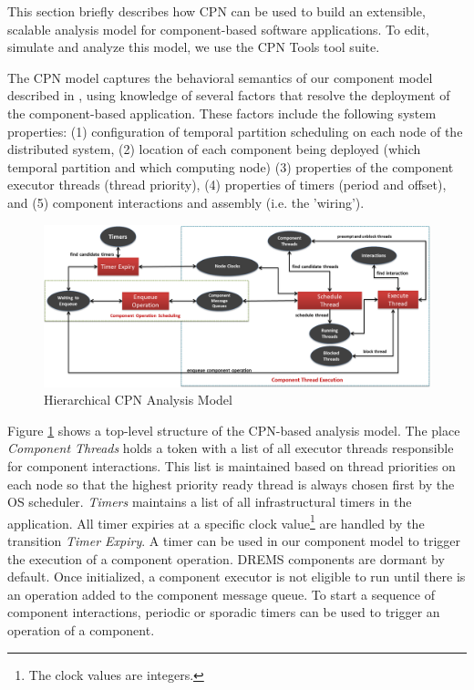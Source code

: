 This section briefly describes how CPN can be used to build an extensible, scalable analysis model for component-based software applications. To edit, simulate and analyze this model, we use the CPN Tools \cite{CPNTools} tool suite. 

The CPN model captures the behavioral semantics of our component model described in \cite{ISIS_F6_ISORC:13}, using knowledge of several factors that resolve the deployment of the component-based application. These factors include the following system properties: (1) configuration of temporal partition scheduling on each node of the distributed system, (2) location of each component being deployed (which temporal partition and which computing node) (3) properties of the component executor threads (thread priority), (4) properties of timers (period and offset), and (5) component interactions and assembly (i.e. the 'wiring'). 

\begin{figure}[t]
	\centering
	\includegraphics[width=\textwidth]{./figs/cpn_model}
	\caption{Hierarchical CPN Analysis Model}
	\label{fig:cpn_model}
	\vspace{-0.1in}
\end{figure}

Figure \ref{fig:cpn_model} shows a top-level structure of the CPN-based analysis model. The place \emph{Component Threads} holds a token with a list of all executor threads responsible for component interactions. This list is maintained based on thread priorities on each node so that the highest priority ready thread is always chosen first by the OS scheduler. \emph{Timers} maintains a list of all infrastructural timers in the application. All timer expiries at a specific clock value\footnote{The clock values are integers.} are handled by the transition \emph{Timer Expiry}. A timer can be used in our component model to trigger the execution of a component operation. DREMS components are dormant by default.  Once initialized, a component executor is not eligible to run until there is an operation added to the component message queue. To start a sequence of component interactions, periodic or sporadic timers can be used to trigger an operation of a component.

